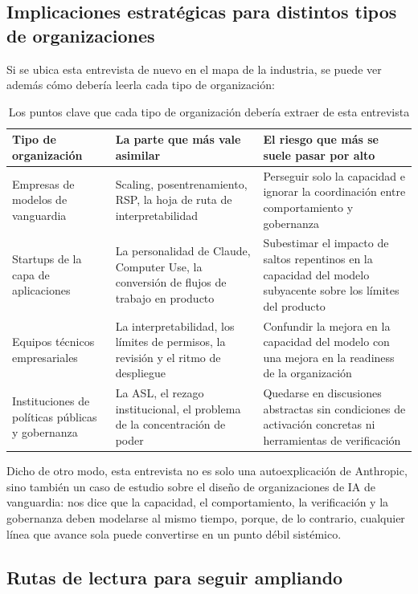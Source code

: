 \subsection{Implicaciones estratégicas para distintos tipos de organizaciones}

Si se ubica esta entrevista de nuevo en el mapa de la industria, se puede ver además cómo debería leerla cada tipo de organización:

\begin{table}[H]
\centering
\begin{tabular}{p{} p{} p{}}
\toprule
Tipo de organización & La parte que más vale asimilar & El riesgo que más se suele pasar por alto \\
\midrule
Empresas de modelos de vanguardia & Scaling, posentrenamiento, RSP, la hoja de ruta de interpretabilidad & Perseguir solo la capacidad e ignorar la coordinación entre comportamiento y gobernanza \\
Startups de la capa de aplicaciones & La personalidad de Claude, Computer Use, la conversión de flujos de trabajo en producto & Subestimar el impacto de saltos repentinos en la capacidad del modelo subyacente sobre los límites del producto \\
Equipos técnicos empresariales & La interpretabilidad, los límites de permisos, la revisión y el ritmo de despliegue & Confundir la mejora en la capacidad del modelo con una mejora en la readiness de la organización \\
Instituciones de políticas públicas y gobernanza & La ASL, el rezago institucional, el problema de la concentración de poder & Quedarse en discusiones abstractas sin condiciones de activación concretas ni herramientas de verificación \\
\bottomrule
\end{tabular}
\caption{Los puntos clave que cada tipo de organización debería extraer de esta entrevista}
\end{table}

Dicho de otro modo, esta entrevista no es solo una autoexplicación de Anthropic, sino también un caso de estudio sobre el diseño de organizaciones de IA de vanguardia: nos dice que la capacidad, el comportamiento, la verificación y la gobernanza deben modelarse al mismo tiempo, porque, de lo contrario, cualquier línea que avance sola puede convertirse en un punto débil sistémico.

\subsection{Rutas de lectura para seguir ampliando}

